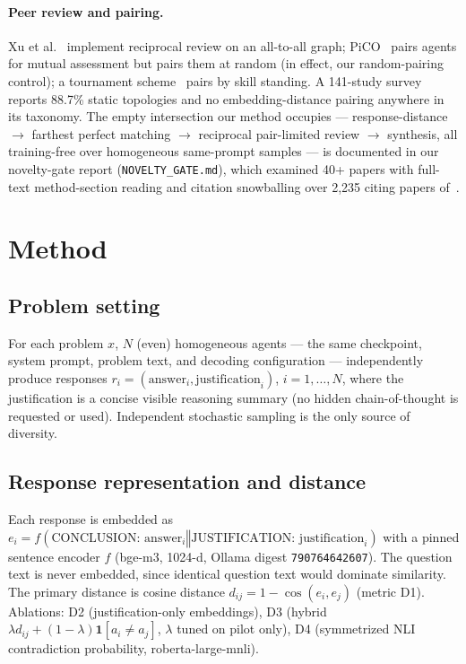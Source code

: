 \documentclass[11pt]{article}
\begin{document}
\paragraph{Peer review and pairing.}
Xu et al.~\cite{xu2023peerreview} implement reciprocal review on an all-to-all graph; PiCO~\cite{pico2024} pairs agents for mutual assessment but pairs them at random (in effect, our random-pairing control); a tournament scheme~\cite{qdtournament} pairs by skill standing. A 141-study survey~\cite{madsurvey2026} reports 88.7\% static topologies and no embedding-distance pairing anywhere in its taxonomy. The empty intersection our method occupies — response-distance $\rightarrow$ farthest perfect matching $\rightarrow$ reciprocal pair-limited review $\rightarrow$ synthesis, all training-free over homogeneous same-prompt samples — is documented in our novelty-gate report (\texttt{NOVELTY\_GATE.md}), which examined 40+ papers with full-text method-section reading and citation snowballing over 2{,}235 citing papers of~\cite{du2023multiagent}.

\section{Method}
\label{sec:method}

\subsection{Problem setting}
For each problem $x$, $N$ (even) homogeneous agents — the same checkpoint, system prompt, problem text, and decoding configuration — independently produce responses
$r_i = (\text{answer}_i, \text{justification}_i)$, $i=1,\dots,N$,
where the justification is a concise visible reasoning summary (no hidden chain-of-thought is requested or used). Independent stochastic sampling is the only source of diversity.

\subsection{Response representation and distance}
Each response is embedded as $e_i = f(\text{CONCLUSION: answer}_i \mathbin{\Vert} \text{JUSTIFICATION: justification}_i)$ with a pinned sentence encoder $f$ (bge-m3, 1024-d, Ollama digest \texttt{790764642607}). The question text is never embedded, since identical question text would dominate similarity. The primary distance is cosine distance $d_{ij} = 1 - \cos(e_i, e_j)$ (metric D1). Ablations: D2 (justification-only embeddings), D3 (hybrid $\lambda d_{ij} + (1-\lambda)\mathbf{1}[a_i \neq a_j]$, $\lambda$ tuned on pilot only), D4 (symmetrized NLI contradiction probability, roberta-large-mnli).
\end{document}
